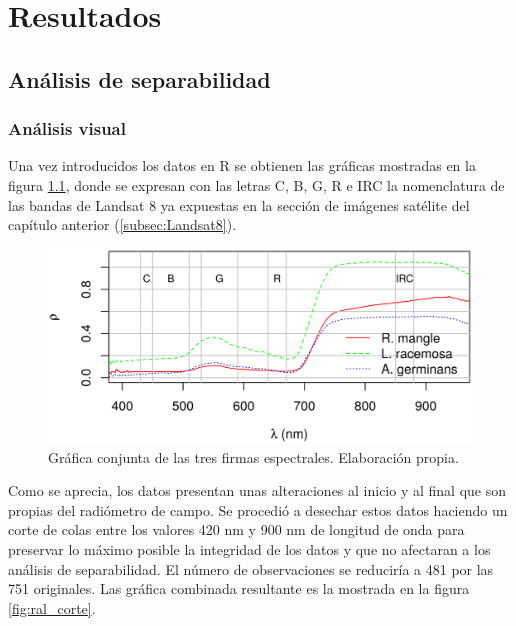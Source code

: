 


\chapter{Resultados}
\label{cap:resultados}

\section{Análisis de separabilidad}
\subsection{Análisis visual}
Una vez introducidos los datos en R se obtienen las gráficas mostradas en la figura \ref{fig:ral}, donde se expresan con las letras C, B, G, R e IRC la nomenclatura de las bandas de Landsat 8 ya expuestas en la sección de imágenes satélite del capítulo anterior (\ref{subsec:Landsat8}).%


\begin{figure}
	\centering
	\includegraphics[width=0.8\linewidth]{./Imagenes/ral2.eps}
	\caption[Firmas espectrales de las tres especies]{Gráfica conjunta de las tres firmas espectrales. Elaboración propia.}
	\label{fig:ral}
\end{figure}

Como se aprecia, los datos presentan unas alteraciones al inicio y al final que son propias del radiómetro de campo. Se procedió a desechar estos datos haciendo un corte de colas entre los valores 420 nm y 900 nm de longitud de onda para preservar lo máximo posible la integridad de los datos y que no afectaran a los análisis de separabilidad. El número de observaciones se reduciría a 481 por las 751 originales. Las gráfica combinada resultante es la mostrada en la figura \ref{fig:ral_corte}.%

